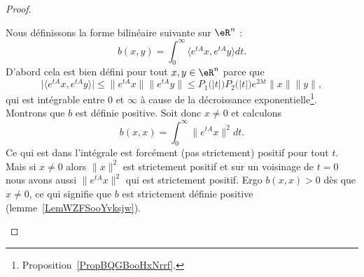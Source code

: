 \begin{proof}
\begin{subproof}
		Nous définissons la forme bilinéaire suivante sur \( \eR^n\) :
		\begin{equation}
			b(x,y)=\int_0^{\infty}\langle  e^{tA}x,  e^{tA}y\rangle dt.
		\end{equation}
		D'abord cela est bien défini pour tout \( x,y\in \eR^n\) parce que
		\begin{equation}
			\big| \langle  e^{tA}x,  e^{tA}y\rangle  \big|\leq \|  e^{tA}x \|\|  e^{tA}y \|\leq P_1\big( | t | \big)P_2\big( | t | \big) e^{2\lambda t}\| x \|\| y \|,
		\end{equation}
		qui est intégrable entre \( 0\) et \( \infty\) à cause de la décroissance exponentielle\footnote{Proposition~\ref{PropBQGBooHxNrrf}.}. Montrons que \( b\) est définie positive. Soit donc \( x\neq 0\) et calculons
		\begin{equation}
			b(x,x)=\int_0^{\infty}\|  e^{tA}x \|^2dt.
		\end{equation}
		Ce qui est dans l'intégrale est forcément (pas strictement) positif pour tout \( t\). Mais si \( x\neq 0\) alors \( \| x \|^2\) est strictement positif et sur un voisinage de \( t=0\) nous avons aussi \( \|  e^{tA}x \|^2\) qui est strictement positif. Ergo \( b(x,x)>0\) dès que \( x\neq 0\), ce qui signifie que \( b\) est strictement définie positive (lemme~\ref{LemWZFSooYvksjw}).


\end{subproof}
\end{proof}
